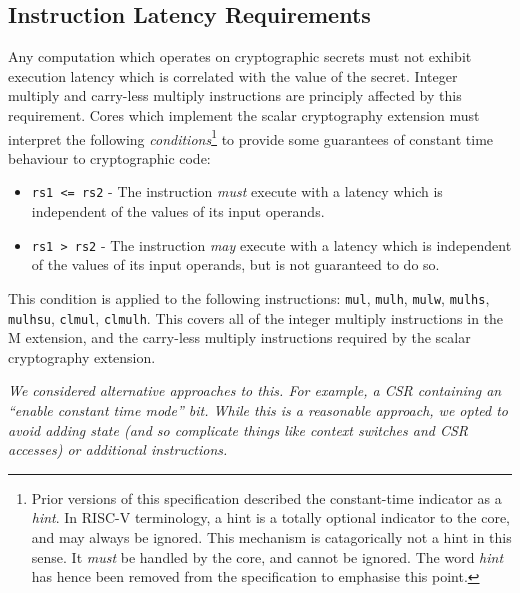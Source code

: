 
\subsection{Instruction Latency Requirements}
\label{sec:scalar:timing}

Any computation which operates on cryptographic secrets must not
exhibit execution latency which is correlated with the value of the
secret.
Integer multiply and carry-less multiply instructions are principly affected
by this requirement.
Cores which implement the scalar cryptography
extension must interpret the following {\em conditions}\footnote{
Prior versions of this specification described the constant-time indicator
as a {\em hint}. In RISC-V terminology, a hint is a totally optional
indicator to the core, and may always be ignored.
This mechanism is catagorically not a hint in this sense.
It {\em must} be handled by the core, and cannot be ignored.
The word {\em hint} has hence been removed from the specification to
emphasise this point.
} to provide some
guarantees of constant time behaviour to cryptographic code:

\begin{itemize}
\item {\tt rs1 <= rs2} - 
    The instruction {\em must} execute with a latency which is
    independent of the values of its input operands.
\item {\tt rs1  > rs2} - 
    The instruction {\em may} execute with a latency which is
    independent of the values of its input operands, but is not
    guaranteed to do so.
\end{itemize}

This condition is applied to the following instructions:
{\tt mul},
{\tt mulh},
{\tt mulw},
{\tt mulhs},
{\tt mulhsu},
{\tt clmul},
{\tt clmulh}.
This covers all of the integer multiply instructions in the
M extension, and the carry-less multiply instructions required by the
scalar cryptography extension.

\begin{displayquote}{\em
We considered alternative approaches to this.
For example, a CSR containing an ``enable constant time mode'' bit.
While this is a reasonable approach, we opted to avoid adding
state (and so complicate things like context switches and CSR accesses)
or additional instructions.
}\end{displayquote}

